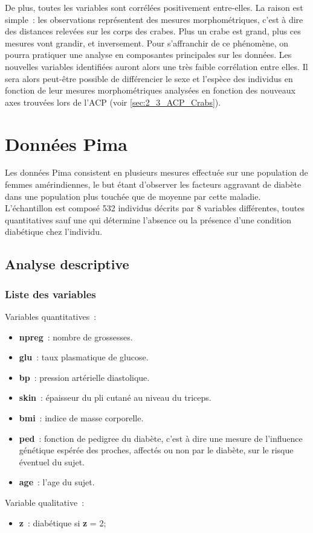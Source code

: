 \documentclass[a4paper,11pt]{report}
\begin{document}
De plus, toutes les variables sont corrélées positivement entre-elles. La raison est simple~: les observations représentent des mesures morphométriques, c'est à dire des distances relevées sur les corps des crabes. Plus un crabe est grand, plus ces mesures vont grandir, et inversement.
Pour s'affranchir de ce phénomène, on pourra pratiquer une analyse en composantes principales sur les données. Les nouvelles variables identifiées auront alors une très faible corrélation entre elles. Il sera alors peut-être possible de différencier le sexe et l'espèce des individus en fonction de leur mesures morphométriques analysées en fonction des nouveaux axes trouvées lors de l'ACP (voir \autoref{sec:2_3_ACP_Crabs}).


\section{Données Pima}
\label{section:pima-descriptif}

Les données Pima consistent en plusieurs mesures effectuée sur une population de femmes amérindiennes, le but étant d'observer les facteurs aggravant de diabète dans une population plus touchée que de moyenne par cette maladie.
L'échantillon est composé 532 individus décrits par 8 variables différentes, toutes quantitatives sauf une qui détermine l'absence ou la présence d'une condition diabétique chez l'individu.

\subsection{Analyse descriptive}

\subsubsection{Liste des variables}

Variables quantitatives~:
\begin{itemize}
	\item \textbf{npreg}~: nombre de grossesses.
	\item \textbf{glu}~: taux plasmatique de glucose.
	\item \textbf{bp}~: pression artérielle diastolique.
	\item \textbf{skin}~: épaisseur du pli cutané au niveau du triceps.
	\item \textbf{bmi}~: indice de masse corporelle.
	\item \textbf{ped}~: fonction de pedigree du diabète, c'est à dire une mesure de l’influence génétique espérée des proches, affectés ou non par le diabète, sur le risque éventuel du sujet.
	\item \textbf{age}~: l'age du sujet.
\end{itemize}
Variable qualitative~:
\begin{itemize}
	\item \textbf{z}~: diabétique si \textbf{z} = 2;
\end{itemize}
\end{document}
